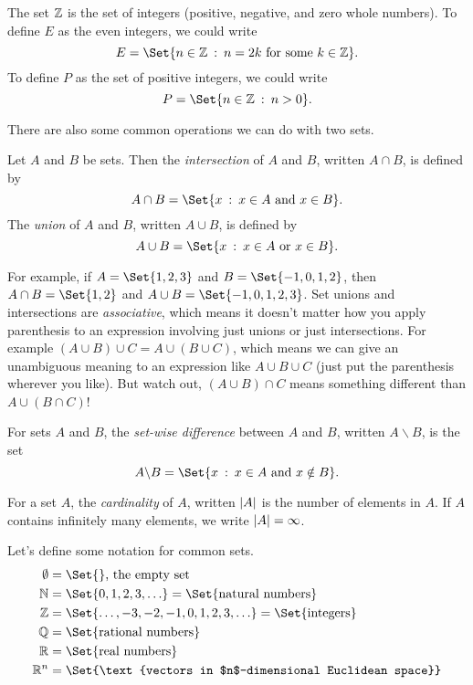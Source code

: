 	\begin{example}
		The set $\mathbb{Z}$ is the set of integers (positive, negative,
		and zero whole numbers).  To define $E$ as the even integers,
		we could write
		\[
			E=\Set{n\in \Z\given n=2k\text{ for some }k\in \Z}.
		\]
		To define $P$ as the set of positive integers, we could write
		\[
			P=\Set{n\in\Z\given n>0}.
		\]
	\end{example}


	There are also some common operations we can do with two sets.
	\begin{definition}
		Let $A$ and $B$ be sets. Then the \emph{intersection} of $A$ and $B$, written
		$A\cap B$, is defined by
		\[
			A\cap B=\Set{x\given x\in A\text{ and }x\in B}.
		\]
		The \emph{union} of $A$ and $B$, written $A\cup B$, is defined by
		\[
			A\cup B= \Set{x\given x\in A\text{ or } x\in B}.
		\]
	\end{definition}
	For example, if $A=\Set{1,2,3}$ and $B=\Set{-1,0,1,2}$, then $A\cap B=\Set{1,2}$ and $A\cup B=
	\Set{-1,0,1,2,3}$.  Set unions and intersections are \emph{associative}, which means it doesn't
	matter how you apply parenthesis to an expression involving just unions or just intersections.
	For example $(A\cup B)\cup C=A\cup(B\cup C)$, which means
	we can give an unambiguous meaning to an expression like $A\cup B\cup C$ (just put
	the parenthesis wherever you like).  But watch out, $(A\cup B)\cap C$ means something
	different than $A\cup(B\cap C)$!

	\begin{definition}
		For sets $A$ and $B$, the \emph{set-wise difference} between $A$ and $B$,
		written $A\backslash B$, is the set
		\[
			A\backslash B = \Set{x\given x\in A\text{ and }x\notin B}.
		\]
	\end{definition}
	\begin{definition}[Cardinality]
		For a set $A$, the \emph{cardinality} of $A$,
		written $\lvert A\rvert$ is the number of elements in $A$.  If $A$
		contains infinitely many elements, we write $\lvert A\rvert=\infty$.
	\end{definition}

	Let's define some notation for common sets.
	\begin{align*}
		\emptyset &= \Set{}\text{, the empty set}\\
		\N &= \Set{0,1,2,3,\ldots}=\Set{\text{natural numbers}}\\
		\Z &= \Set{\ldots, -3,-2,-1,0,1,2,3,\ldots}=\Set{\text{integers}}\\
		\Q &= \Set{\text{rational numbers}}\\
		\R &= \Set{\text{real numbers}}\\
		\R^n &= \Set{\text{vectors in $n$-dimensional Euclidean space}}\\
	\end{align*}

